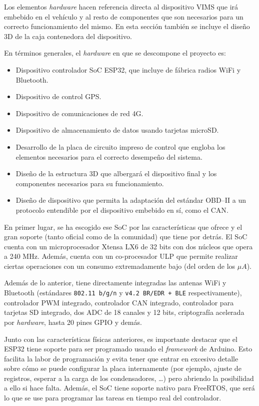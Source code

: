 Los elementos \textit{hardware} hacen referencia directa al dispositivo \ac{VIMS}
que irá embebido en el vehículo y al resto de componentes que son necesarios para
un correcto funcionamiento del mismo. En esta sección también se incluye el
diseño 3D de la caja contenedora del dispositivo.

En términos generales, el \textit{hardware} en que se descompone el proyecto es:

\begin{itemize}
  \item Dispositivo controlador \ac{SoC} ESP32, que incluye de fábrica radios WiFi y Bluetooth.
  \item Dispositivo de control \ac{GPS}.
  \item Dispositivo de comunicaciones de red 4G.
  \item Dispositivo de almacenamiento de datos usando tarjetas microSD.
  \item Desarrollo de la placa de circuito impreso de control que engloba los elementos
        necesarios para el correcto desempeño del sistema.
  \item Diseño de la estructura 3D que albergará el dispositivo final y los componentes
        necesarios para su funcionamiento.
  \item Diseño de dispositivo que permita la adaptación del estándar \ac{OBD}--II a
        un protocolo entendible por el dispositivo embebido en sí, como el \ac{CAN}.
\end{itemize}

En primer lugar, se ha escogido ese \ac{SoC} por las características que
ofrece y el gran soporte (tanto oficial como de la comunidad) que tiene por detrás.
El \ac{SoC} cuenta con un microprocesador Xtensa LX6 de 32 bits con dos
núcleos que opera a 240 MHz. Además, cuenta con un co-procesador \ac{ULP} que permite realizar
ciertas operaciones con un consumo extremadamente bajo (del orden de los $\mu A$).

Además de lo anterior, tiene directamente integradas las antenas WiFi y Bluetooth
(estándares \texttt{802.11 b/g/n} y \texttt{v4.2 \ac{BR/EDR} + \ac{BLE}} respectivamente),
controlador \ac{PWM} integrado, controlador \ac{CAN} integrado, controlador para
tarjetas SD integrado, dos \ac{ADC} de 18 canales y 12 bits,
criptografía acelerada por \textit{hardware}, hasta 20 pines \ac{GPIO} y demás.

Junto con las características físicas anteriores, es importante destacar que el
ESP32 tiene soporte para ser programado usando el \textit{framework} de Arduino.
Esto facilita la labor de programación y evita tener que entrar
en excesivo detalle sobre cómo se puede configurar la placa internamente
(por ejemplo, ajuste de registros, esperar a la carga de los condensadores, \dots)
pero abriendo la posibilidad a ello si hace falta. Además, el \ac{SoC} tiene
soporte nativo para FreeRTOS, que será lo que se use para programar las tareas
en tiempo real del controlador.

